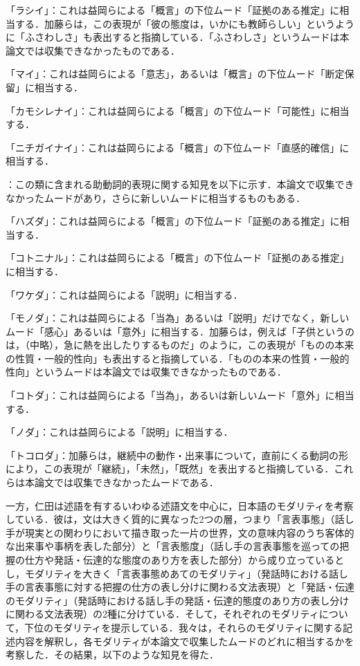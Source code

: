\documentclass[japanese]{jnlp_1.4}
\newcommand{\InH}[1]{}
\newcommand{\InHone}[1]{}
\begin{document}
\InH{(1-4)}「ラシイ」：これは益岡らによる「概言」の下位ムード「証拠のある推定」に相当する．加藤らは，この表現が「彼の態度は，いかにも教師らしい」というように「ふさわしさ」も表出すると指摘している．「ふさわしさ」というムードは本論文では収集できなかったものである．

\InH{(1-5)}「マイ」：これは益岡らによる「意志」，あるいは「概言」の下位ムード「断定保留」に相当する．

\InH{(1-6)}「カモシレナイ」：これは益岡らによる「概言」の下位ムード「可能性」に相当する．

\InH{(1-7)}「ニチガイナイ」：これは益岡らによる「概言」の下位ムード「直感的確信」に相当する．

\InHone{(2)}
：この類に含まれる助動詞的表現に関する知見を以下に示す．本論文で収集できなかったムードがあり，さらに新しいムードに相当するものもある．

\InH{(2-1)}「ハズダ」：これは益岡らによる「概言」の下位ムード「証拠のある推定」に相当する．

\InH{(2-2)}「コトニナル」：これは益岡らによる「概言」の下位ムード「証拠のある推定」に相当する．

\InH{(2-3)}「ワケダ」：これは益岡らによる「説明」に相当する．

\InH{(2-4)}「モノダ」：これは益岡らによる「当為」あるいは「説明」だけでなく，新しいムード「感心」あるいは「意外」に相当する．加藤らは，例えば「子供というのは，（中略），急に熱を出したりするものだ」のように，この表現が「ものの本来の性質・一般的性向」も表出すると指摘している．「ものの本来の性質・一般的性向」というムードは本論文では収集できなかったものである．

\InH{(2-5)}「コトダ」：これは益岡らによる「当為」，あるいは新しいムード「意外」に相当する．

\InH{(2-6)}「ノダ」：これは益岡らによる「説明」に相当する．

\InH{(2-7)}「トコロダ」：加藤らは，継続中の動作・出来事について，直前にくる動詞の形により，この表現が「継続」，「未然」，「既然」を表出すると指摘している．これらは本論文では収集できなかったムードである．

一方，仁田は述語を有するいわゆる述語文を中心に，日本語のモダリティを考察している．彼は，文は大きく質的に異なった2つの層，つまり「言表事態」（話し手が現実との関わりにおいて描き取った一片の世界，文の意味内容のうち客体的な出来事や事柄を表した部分）と「言表態度」（話し手の言表事態を巡っての把握の仕方や発話・伝達的な態度のあり方を表した部分）から成り立っているとし，モダリティを大きく「言表事態めあてのモダリティ」（発話時における話し手の言表事態に対する把握の仕方の表し分けに関わる文法表現）と「発話・伝達のモダリティ」（発話時における話し手の発話・伝達的態度のあり方の表し分けに関わる文法表現）の2種に分けている．そして，それぞれのモダリティについて，下位のモダリティを提示している．我々は，それらのモダリティに関する記述内容を解釈し，各モダリティが本論文で収集したムードのどれに相当するかを考察した．その結果，以下のような知見を得た．
\end{document}
